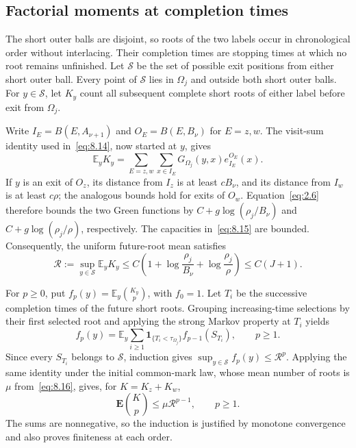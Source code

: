 \documentclass[11pt,a4paper]{article}
\numberwithin{equation}{section}
\theoremstyle{remark}
\begin{document}
\subsection{Factorial moments at completion times}\label{sec:factorial}
The short outer balls are disjoint, so roots of the two labels occur in chronological order without interlacing. Their completion times are stopping times at which no root remains unfinished. Let $\mathcal S$ be the set of possible exit positions from either short outer ball. Every point of $\mathcal S$ lies in $\Omega_j$ and outside both short outer balls. For $y\in\mathcal S$, let $K_y$ count all subsequent complete short roots of either label before exit from $\Omega_j$.

Write $I_E=B(E,A_{\nu+1})$ and $O_E=B(E,B_\nu)$ for $E=z,w$. The visit-sum identity used in~\eqref{eq:8.14}, now started at $y$, gives
\[
\mathbb E_yK_y
=\sum_{E=z,w}\sum_{x\in I_E}
G_{\Omega_j}(y,x)e_{I_E}^{O_E}(x).
\]
If $y$ is an exit of $O_z$, its distance from $I_z$ is at least $cB_\nu$, and its distance from $I_w$ is at least $c\rho$; the analogous bounds hold for exits of $O_w$. Equation~\eqref{eq:2.6} therefore bounds the two Green functions by $C+g\log(\rho_j/B_\nu)$ and $C+g\log(\rho_j/\rho)$, respectively. The capacities in~\eqref{eq:8.15} are bounded. Consequently, the uniform future-root mean satisfies
\begin{equation}\label{eq:8.17}
\mathcal R:=\sup_{y\in\mathcal S}\mathbb E_yK_y
\le C\left(1+\log\frac{\rho_j}{B_{\nu}}+\log\frac{\rho_j}{\rho}\right)
\le C(J+1).
\end{equation}

For $p\ge0$, put $f_p(y)=\mathbb E_y\binom{K_y}{p}$, with $f_0=1$. Let $T_i$ be the successive completion times of the future short roots. Grouping increasing-time selections by their first selected root and applying the strong Markov property at $T_i$ yields
\begin{equation}\label{eq:completion-recursion}
f_p(y)=\mathbb E_y\sum_{i\ge1}
\mathbf1_{\{T_i<\tau_{\Omega_j}\}}f_{p-1}(S_{T_i}),
\qquad p\ge1.
\end{equation}
Since every $S_{T_i}$ belongs to $\mathcal S$, induction gives $\sup_{y\in\mathcal S}f_p(y)\le\mathcal R^p$. Applying the same identity under the initial common-mark law, whose mean number of roots is $\mu$ from~\eqref{eq:8.16}, gives, for $K=K_z+K_w$,
\begin{equation}\label{eq:8.18}
\mathbf E\binom Kp\le\mu\mathcal R^{p-1},\qquad p\ge1.
\end{equation}
The sums are nonnegative, so the induction is justified by monotone convergence and also proves finiteness at each order.
\end{document}
